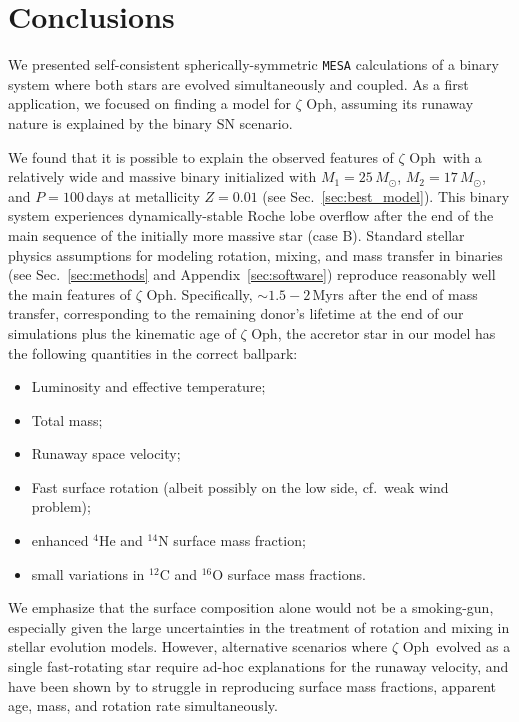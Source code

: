 \documentclass[twocolumn,twocolappendix,trackchanges]{aastex63}
\DeclareRobustCommand{\Secref}[1]{Sec.~\ref{#1}}
\newcommand{\zoph}{$\zeta$ Oph}
\begin{document}
\section{Conclusions}
\label{sec:conclusions}

We presented self-consistent spherically-symmetric \texttt{MESA}
calculations of a binary system where both stars are evolved
simultaneously and coupled. As a first application, we focused on
finding a model for \zoph, assuming its runaway nature is explained by
the binary SN scenario.

We found that it is possible to explain the observed features of
\zoph\ with a relatively wide and massive binary initialized with
$M_1=25\,M_\odot$, $M_2=17\,M_\odot$, and $P=100$\,days at metallicity
$Z=0.01$ (see \Secref{sec:best_model}). This binary system experiences dynamically-stable Roche
lobe overflow after the end of the main sequence of the initially more massive star
(case B). Standard stellar physics assumptions for modeling rotation,
mixing, and mass transfer in binaries (see \Secref{sec:methods} and
Appendix~\ref{sec:software}) reproduce reasonably well the
main features of \zoph. Specifically,
$\sim$$1.5-2$\,Myrs after the end of mass transfer, corresponding to the
remaining donor's lifetime at the end of our simulations plus the kinematic age of \zoph,
the accretor star in our model has the following quantities in the correct ballpark:
\begin{itemize}
\item Luminosity and effective temperature;
\item Total mass;
\item Runaway space velocity;
\item Fast surface rotation (albeit possibly on the low side, cf.~weak wind problem);
\item enhanced $^4\mathrm{He}$ and $^{14}\mathrm{N}$ surface mass fraction;
\item small variations in $^{12}\mathrm{C}$ and $^{16}\mathrm{O}$ surface mass fractions.
\end{itemize}

We emphasize that the surface composition alone would not be a smoking-gun,
especially given the large uncertainties in the treatment of rotation
and mixing in stellar evolution models. However, alternative scenarios where \zoph\
evolved as a single fast-rotating star require ad-hoc explanations for the runaway velocity,
and have been shown by \citetalias{villamariz:05} to struggle in reproducing
surface mass fractions, apparent age, mass, and rotation rate simultaneously.
\end{document}
